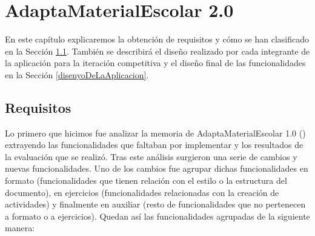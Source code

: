 \chapter{AdaptaMaterialEscolar 2.0}
\label{cap:AdaptaMaterialEscolar2.0}
En este capítulo explicaremos la obtención de requisitos y cómo se han clasificado en la Sección \ref{cap:requisitos}. También se describirá el diseño realizado por cada integrante de la aplicación para la iteración competitiva y el diseño final de las funcionalidades en la Sección \ref{disenyoDeLaAplicacion}.


\section{Requisitos}
\label{cap:requisitos}

Lo primero que hicimos fue analizar la memoria de AdaptaMaterialEscolar 1.0 (\cite*{AdaptaMaterialEscolar1.0}) extrayendo las funcionalidades que faltaban por implementar y los resultados de la evaluación que se realizó. Tras este análisis surgieron una serie de cambios y nuevas funcionalidades. Uno de los cambios fue agrupar dichas funcionalidades en formato (funcionalidades que tienen relación con el estilo o la estructura del documento), en ejercicios (funcionalidades relacionadas con la creación de actividades) y finalmente en auxiliar (resto de funcionalidades que no pertenecen a formato o a ejercicios). Quedan así las funcionalidades agrupadas de la siguiente manera:
\\

